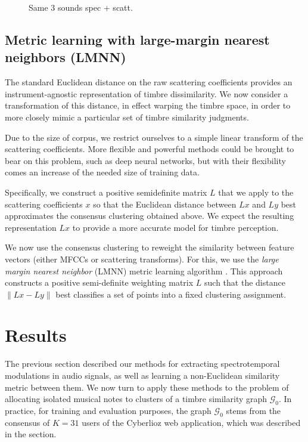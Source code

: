 \documentclass{bmcart}
\newcommand{\lnameref}[1]{%
\bgroup
\let\nmu\MakeLowercase
\nameref{#1}\egroup}
\newcommand{\nmu}{}
\begin{document}
\begin{figure}
\caption{
Same 3 sounds spec + scatt.
}
\end{figure}

\subsection*{Metric learning with large-margin nearest neighbors (LMNN)}
\label{sec:weighting}

The standard Euclidean distance on the raw scattering coefficients provides an instrument-agnostic representation of timbre dissimilarity.
We now consider a transformation of this distance, in effect warping the timbre space, in order to more closely mimic a particular set of timbre similarity judgments.

Due to the size of corpus, we restrict ourselves to a simple linear transform of the scattering coefficients. More flexible and powerful methods could be brought to bear on this problem, such as deep neural networks, but with their flexibility comes an increase of the needed size of training data.

Specifically, we construct a positive semidefinite matrix $L$ that we apply to the scattering coefficients $x$ so that the Euclidean distance between $Lx$ and $Ly$ best approximates the consensus clustering obtained above.
We expect the resulting representation $Lx$ to provide a more accurate model for timbre perception.

We now use the consensus clustering to reweight the similarity between feature vectors (either MFCCs or scattering transforms).
For this, we use the \emph{large margin nearest neighbor} (LMNN) metric learning algorithm \cite{weinberger2006distance, weinberger2009distance}.
This approach constructs a positive semi-definite weighting matrix $L$ such that the distance $\|Lx - Ly\|$ best classifies a set of points into a fixed clustering assignment.



\section*{\nmu Results}
\label{sec:results}

The previous section described our methods for extracting spectrotemporal modulations in audio signals, as well as learning a non-Euclidean similarity metric between them.
We now turn to apply these methods to the problem of allocating isolated musical notes to clusters of a timbre similarity graph $\mathcal{G}_0$.
In practice, for training and evaluation purposes, the graph $\mathcal{G}_0$ stems from the consensus of $K=31$ users of the Cyberlioz web application, which was described in the \lnameref{sec:survey} section.
\end{document}
